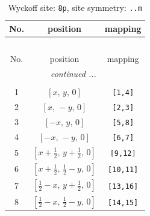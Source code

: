 \documentclass[fleqn,8pt]{jsarticle}
\begin{document}
\begin{longtable}{ccc}
\caption{Wyckoff site: {\tt 8p}, site symmetry: {\tt ..m}}
 \\
 \hline \hline
No. & position & mapping \\ \hline \endfirsthead

\multicolumn{2}{l}{\tablename\ \thetable{}} \\
 \hline \hline
No. & position & mapping \\ \hline \endhead

 \hline \hline
\multicolumn{2}{r}{\footnotesize\it continued ...} \\ \endfoot

 \hline \hline
\multicolumn{2}{r}{} \\ \endlastfoot

1 & $\left[ x,\, y,\, 0 \right]$ & {\tt [1,4]} \\ \hline
2 & $\left[ x,\, - y,\, 0 \right]$ & {\tt [2,3]} \\ \hline
3 & $\left[ - x,\, y,\, 0 \right]$ & {\tt [5,8]} \\ \hline
4 & $\left[ - x,\, - y,\, 0 \right]$ & {\tt [6,7]} \\ \hline
5 & $\left[ x + \frac{1}{2},\, y + \frac{1}{2},\, 0 \right]$ & {\tt [9,12]} \\ \hline
6 & $\left[ x + \frac{1}{2},\, \frac{1}{2} - y,\, 0 \right]$ & {\tt [10,11]} \\ \hline
7 & $\left[ \frac{1}{2} - x,\, y + \frac{1}{2},\, 0 \right]$ & {\tt [13,16]} \\ \hline
8 & $\left[ \frac{1}{2} - x,\, \frac{1}{2} - y,\, 0 \right]$ & {\tt [14,15]} \\
\end{longtable}
\renewcommand{\arraystretch}{1.2}
\end{document}
